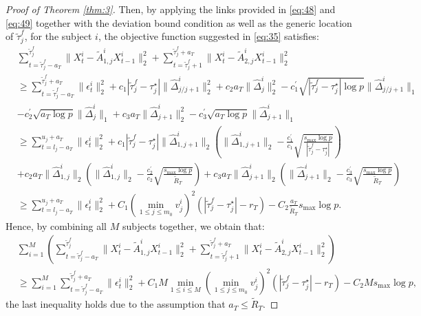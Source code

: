 \documentclass[11pt]{article}
\begin{document}
\begin{proof}[Proof of Theorem \ref{thm:3}]
Then, by applying the links provided in \eqref{eq:48} and \eqref{eq:49} together with the deviation bound condition as well as the generic location of $\widetilde{\tau}^f_j$, for the subject $i$, the objective function suggested in \eqref{eq:35} satisfies: 
\begin{align*}
    &\sum_{t= \widetilde{\tau}_j^f - a_T}^{\widetilde{\tau}_j^f}\|X_t^i - \widetilde{A}^i_{1,j}X_{t-1}^i\|_2^2 + \sum_{t=\widetilde{\tau}_j^f + 1}^{\widetilde{\tau}^f_j+a_T}\|X_t^i - \widetilde{A}^i_{2,j}X_{t-1}^i\|_2^2 \\
    &\geq \sum_{t= \widetilde{\tau}^f_j -a_T}^{ \widetilde{\tau}^f_j +a_T}\|\epsilon_t^i\|_2^2 + c_1|\widetilde{\tau}_j^f - \tau_j^\star|\|\widehat{\Delta}^i_{j/j+1}\|_2^2 + c_2 a_T\|\widehat{\Delta}^i_{j}\|_2^2 - c_1^\prime\sqrt{|\widetilde{\tau}_j^f - \tau_j^\star|\log p}\|\widehat{\Delta}_{j/j+1}^i\|_1 \\
    &- c_2^\prime\sqrt{a_T\log p}\|\widehat{\Delta}_{j}^i\|_1 +  c_3a_T\|\widehat{\Delta}^i_{j+1}\|_2^2 - c_3^\prime\sqrt{a_T\log p}\|\widehat{\Delta}^i_{j+1}\|_1 \\
    &\geq \sum_{t=l_j-a_T}^{u_j+a_T}\|\epsilon_t^i\|_2^2 + c_1|\widetilde{\tau}_j^f - \tau_j^\star|\|\widehat{\Delta}^i_{1,j+1}\|_2\left(\|\widehat{\Delta}^i_{1,j+1}\|_2 - \frac{c_1^\prime}{c_1}\sqrt{\frac{s_{\max}\log p}{|\widetilde{\tau}_j^f - \tau_j^\star|}}\right) \\
    &+ c_2a_T\|\widehat{\Delta}^i_{1,j}\|_2\left(\|\widehat{\Delta}^i_{1,j}\|_2 - \frac{c_2^\prime}{c_2}\sqrt{\frac{s_{\max}\log p}{\widetilde{R}_T}}\right) + c_3a_T\|\widehat{\Delta}^i_{j+1}\|_2\left( \|\widehat{\Delta}^i_{j+1}\|_2 - \frac{c_3^\prime}{c_3}\sqrt{\frac{s_{\max}\log p}{\widetilde{R}_T}}\right) \\
    &\geq \sum_{t=l_j-a_T}^{u_j+a_T}\|\epsilon_t^i\|_2^2 + C_1(\min_{1\leq j \leq m_0}v_j^i)^2\left(|\widetilde{\tau}_j^f - \tau_j^\star| - r_T\right) - C_2\frac{a_T}{\widetilde{R}_T}s_{\max}\log p.
\end{align*}
Hence, by combining all $M$ subjects together, we obtain that:
\begin{equation}
    \label{eq:50}
    \begin{aligned}
        &\sum_{i=1}^M\left(\sum_{t= \widetilde{\tau}^f_j -a_T}^{\widetilde{\tau}_j^f}\|X_t^i - \widetilde{A}^i_{1,j}X_{t-1}^i\|_2^2 + \sum_{t=\widetilde{\tau}_j^f + 1}^{\widetilde{\tau}^f_j +a_T}\|X_t^i - \widetilde{A}^i_{2,j}X_{t-1}^i\|_2^2\right) \\
        &\geq \sum_{i=1}^M\sum_{t= \widetilde{\tau}^f_j -a_T}^{\widetilde{\tau}^f_j+a_T}\|\epsilon_t^i\|_2^2 + C_1M\min_{1\leq i\leq M}(\min_{1\leq j \leq m_0}v_j^i)^2\left(|\widetilde{\tau}_j^f - \tau_j^\star|-r_T\right) - C_2M s_{\max}\log p,
    \end{aligned}
\end{equation}
the last inequality holds due to the assumption that $a_T \leq \widetilde{R}_T$.


\end{proof}
\end{document}
